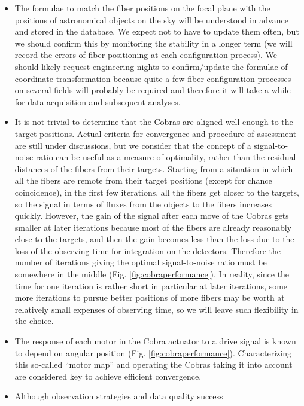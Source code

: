 \documentclass[a4paper]{article}
\begin{document}
\begin{itemize}
\item The formulae to match the fiber positions on the focal plane
  with the positions of astronomical objects on the sky will be
  understood in advance and stored in the database. We expect not to
  have to update them often, but we should confirm this by monitoring
  the stability in a longer term (we will record the errors of fiber
  positioning at each configuration process). We should likely request
  engineering nights to confirm/update the formulae of coordinate
  transformation because quite a few fiber configuration processes on
  several fields will probably be required and therefore it will take
  a while for data acquisition and subsequent analyses.
\item It is not trivial to determine that the Cobras are aligned well
  enough to the target positions. Actual criteria for convergence and
  procedure of assessment are still under discussions, but we
  consider that the concept of a signal-to-noise ratio can be useful
  as a measure of optimality, rather than the residual distances of
  the fibers from their targets. Starting from a situation in which
  all the fibers are remote from their target positions (except for
  chance coincidence), in the first few iterations, all the fibers get
  closer to the targets, so the signal in terms of fluxes from the
  objects to the fibers increases quickly. However, the gain of the
  signal after each move of the Cobras gets smaller at later
  iterations because most of the fibers are already reasonably close
  to the targets, and then the gain becomes less than the loss due to
  the loss of the observing time for integration on the
  detectors. Therefore the number of iterations giving the optimal
  signal-to-noise ratio must be somewhere in the middle
  (Fig. \ref{fig:cobraperformance}). In reality, since the time for
  one iteration is rather short in particular at later iterations,
  some more iterations to pursue better positions of more fibers may
  be worth at relatively small expenses of observing time, so we will
  leave such flexibility in the choice.
\item The response of each motor in the Cobra actuator to a drive
  signal is known to depend on angular position
  (Fig. \ref{fig:cobraperformance}). Characterizing this so-called
  ``motor map'' and operating the Cobras taking it into account are
  considered key to achieve efficient convergence.
\item Although observation strategies and data quality success

\end{itemize}
\end{document}
